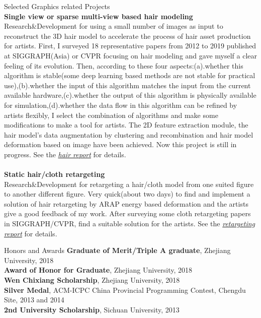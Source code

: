 \documentclass{resume} %
\begin{document}
\begin{rSection}{Selected Graphics related Projects}
  \\{\bf Single view or sparse multi-view based hair modeling}\\ Research\&Development for using a small number of images as input to reconstruct the 3D hair model to accelerate the process of hair asset production for artists. First, I surveyed 18 representative papers from 2012 to 2019 published at SIGGRAPH(Asia) or CVPR focusing on hair modeling and gave myself a clear feeling of its evolution. Then, according to these four aspects:(a).whether this algorithm is stable(some deep learning based methods are not stable for practical use),(b).whether the input of this algorithm matches the input from the current available hardware,(c).whether the output of this algorithm is physically available for simulation,(d).whether the data flow in this algorithm can be refined by artists flexibly, I select the combination of algorithms and make some modifications to make a tool for artists. The 2D feature extraction module, the hair model's data augmentation by clustering and recombination and hair model deformation based on image have been achieved. Now this project is still in progress. See the \emph{\href{https://wtyatzoo.github.io/reports/hair.pdf}{hair report}} for details. \\
  \\{\bf Static hair/cloth retargeting}\\ Research\&Development for retargeting a hair/cloth model from one suited figure to another different figure. Very quick(about two days) to find and implement a solution of hair retargeting by ARAP energy based deformation and  the artists give a good feedback of my work. After surveying some cloth retargeting papers in SIGGRAPH/CVPR, find a suitable solution for the artists. See the \emph{\href{https://wtyatzoo.github.io/reports/retargeting.pdf}{retargeting report}} for details. \\
                         
\end{rSection}

\begin{rSection}{Honors and Awards}
  \textbf{Graduate of Merit/Triple A graduate}, Zhejiang University, 2018\\
  \textbf{Award of Honor for Graduate}, Zhejiang University, 2018\\
  \textbf{Wen Chixiang Scholarship}, Zhejiang University, 2018\\
  \textbf{Silver Medal}, ACM-ICPC China Provincial Programming Contest, Chengdu Site, 2013 and 2014\\
  \textbf{2nd University Scholarship}, Sichuan University, 2013
\end{rSection}
\end{document}
